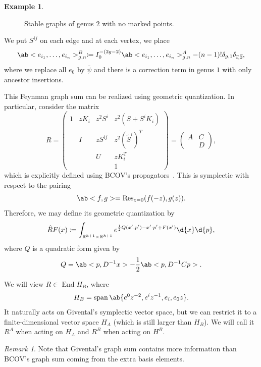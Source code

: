 \documentclass[10pt,oldfontcommands,oneside]{memoir}
\theoremstyle{definition}
\newtheorem{exm}[thm]{Example}
\theoremstyle{remark}
\newtheorem{rmk}[thm]{Remark}
\theoremstyle{plain}
\theoremstyle{definition}
\theoremstyle{remark}
\newcommand{\R}{\mathbb{R}}
\newcommand{\on}[1]{\operatorname{#1}}
\newcommand{\1}{\mathbf{1}}
\newcommand{\2}{\mathbf{2}}
\newcommand{\3}{\mathbf{3}}
\DeclareMathOperator{\End}{End}
\begin{document}
\begin{exm}
\begin{figure}[htpb]
\begin{center}
    \end{center}
    \caption{Stable graphs of genus $2$ with no marked points.}%
    \label{fig:stable graphs of genus 2}
    \end{figure}
    We put $S^{ij}$ on each edge and at each vertex, we place
    \[ \ab<e_{i_1}, \ldots, e_{i_n}>_{g,n}^{B} \coloneqq I_0^{-(2g-2)} \ab<e_{i_1}, \ldots, e_{i_n}>_{g,n}^A - (n-1)! \delta_{g,1} \delta_{\vec{\imath}, \vec{0}}, \]
    where we replace all $e_0$ by $\bar{\psi}$ and there is a correction term in genus $1$ with only ancestor insertions. 
\end{exm}

This Feynman graph sum can be realized using geometric quantization. In particular, consider the matrix
\[ R = \begin{pmatrix}
    1 & z K_i & z^2 S^i & z^2 (S + S^i K_i) \\
    & I & z S^{ij} & z^2 (\tilde{S}^i)^T \\
    & & U & z K_i^T \\
    & & & 1
\end{pmatrix} = \begin{pmatrix}
    A & C \\
    & D
\end{pmatrix}, \]
which is explicitly defined using BCOV's propagators~\cite{bcov}. This is symplectic with respect to the pairing
\[ \ab<f,g> = \on{Res}_{z=0} (f(-z), g(z)). \]
Therefore, we may define its geometric quantization by
\[ \hat{R} F(x) \coloneqq \int_{\R^{h+1} \times \R^{h+1}} e^{\frac{1}{2} Q(x',p') - x' \cdot p' + F(x')} \d{x} \d{p}, \]
where $Q$ is a quadratic form given by
\[ Q = \ab<p,D^{-1}x> - \frac{1}{2}\ab<p, D^{-1}C p>. \]

We will view $R \in \End H_B$, where
\[ H_B = \on{span} \ab\{ e^0 z^{-2}, e^i z^{-1}, e_i, e_0 z \}. \]
It naturally acts on Givental's symplectic vector space, but we can restrict it to a finite-dimensional vector space $H_A$ (which is still larger than $H_B$). We will call it $R^A$ when acting on $H_A$ and $R^B$ when acting on $H^B$.

\begin{rmk}
    Note that Givental's graph sum contains more information than BCOV's graph sum coming from the extra basis elements.
\end{rmk}
\end{document}
